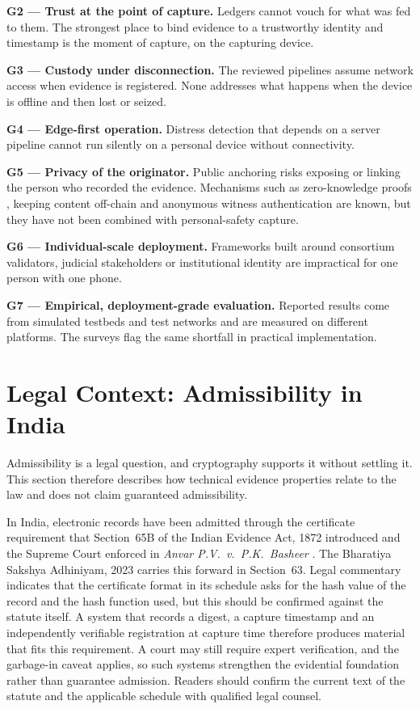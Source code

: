 \documentclass[conference,a4paper,10pt]{IEEEtran}
\begin{document}
\textbf{G2 --- Trust at the point of capture.} Ledgers cannot vouch for what was fed to them. The strongest place to bind evidence to a trustworthy identity and timestamp is the moment of capture, on the capturing device.

\textbf{G3 --- Custody under disconnection.} The reviewed pipelines assume network access when evidence is registered. None addresses what happens when the device is offline and then lost or seized.

\textbf{G4 --- Edge-first operation.} Distress detection that depends on a server pipeline cannot run silently on a personal device without connectivity.

\textbf{G5 --- Privacy of the originator.} Public anchoring risks exposing or linking the person who recorded the evidence. Mechanisms such as zero-knowledge proofs \cite{lavin}, keeping content off-chain \cite{jaquet,saif} and anonymous witness authentication \cite{mli} are known, but they have not been combined with personal-safety capture.

\textbf{G6 --- Individual-scale deployment.} Frameworks built around consortium validators, judicial stakeholders or institutional identity \cite{ratul,khan,jeong} are impractical for one person with one phone.

\textbf{G7 --- Empirical, deployment-grade evaluation.} Reported results come from simulated testbeds and test networks \cite{aigboduwa,mli,ratul} and are measured on different platforms. The surveys \cite{akinbi,batista,onyeashie} flag the same shortfall in practical implementation.

\section{Legal Context: Admissibility in India}\label{sec:legal}
Admissibility is a legal question, and cryptography supports it without settling it. This section therefore describes how technical evidence properties relate to the law and does not claim guaranteed admissibility.

In India, electronic records have been admitted through the certificate requirement that Section~65B of the Indian Evidence Act, 1872 introduced and the Supreme Court enforced in \emph{Anvar P.V.\ v.\ P.K.\ Basheer} \cite{anvar}. The Bharatiya Sakshya Adhiniyam, 2023 \cite{bsa} carries this forward in Section~63. Legal commentary indicates that the certificate format in its schedule asks for the hash value of the record and the hash function used, but this should be confirmed against the statute itself. A system that records a digest, a capture timestamp and an independently verifiable registration at capture time therefore produces material that fits this requirement. A court may still require expert verification, and the garbage-in caveat applies, so such systems strengthen the evidential foundation rather than guarantee admission. Readers should confirm the current text of the statute and the applicable schedule with qualified legal counsel.
\end{document}
